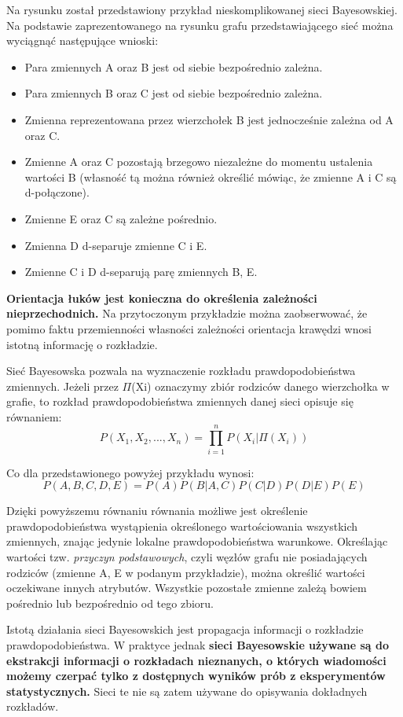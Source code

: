 Na rysunku został przedstawiony przykład nieskomplikowanej sieci Bayesowskiej. Na podstawie zaprezentowanego na rysunku grafu przedstawiającego sieć można wyciągnąć następujące wnioski:
\begin{itemize}
\item Para zmiennych A oraz B jest od siebie bezpośrednio zależna.
\item Para zmiennych B oraz C jest od siebie bezpośrednio zależna.
\item Zmienna reprezentowana przez wierzchołek B jest jednocześnie zależna od A oraz C.
\item Zmienne A oraz C pozostają brzegowo niezależne do momentu ustalenia wartości B (własność tą można również określić mówiąc, że zmienne A i C są d-połączone).
\item Zmienne E oraz C są zależne pośrednio.
\item Zmienna D d-separuje zmienne C i E.
\item Zmienne C i D d-separują parę zmiennych B, E.
\end{itemize}

\textbf{Orientacja łuków jest konieczna do określenia zależności nieprzechodnich.} Na przytoczonym przykładzie można zaobserwować, że pomimo faktu przemienności własności zależności orientacja krawędzi wnosi istotną informację o rozkładzie.\newline

\newpage

Sieć Bayesowska pozwala na wyznaczenie rozkładu prawdopodobieństwa zmiennych. Jeżeli przez \(\Pi\)(Xi) oznaczymy zbiór rodziców danego wierzchołka w grafie, to rozkład prawdopodobieństwa zmiennych danej sieci opisuje się równaniem:
$$ P(X_{1}, X_{2}, ... , X_{n}) = \prod _{i=1}^{n}P(X_{i} | \Pi (X_{i})) $$

Co dla przedstawionego powyżej przykładu wynosi:
$$ P(A,B,C,D,E) = P(A)P(B|A,C)P(C|D)P(D|E)P(E) $$ 

Dzięki powyższemu równaniu równania możliwe jest określenie prawdopodobieństwa wystąpienia określonego wartościowania wszystkich zmiennych, znając jedynie lokalne prawdopodobieństwa warunkowe. Określając wartości tzw. \textit{przyczyn podstawowych}, czyli węzłów grafu nie posiadających rodziców (zmienne A, E w podanym przykładzie), można określić wartości oczekiwane innych atrybutów. Wszystkie pozostałe zmienne zależą bowiem pośrednio lub bezpośrednio od tego zbioru.

Istotą działania sieci Bayesowskich jest propagacja informacji o rozkładzie prawdopodobieństwa. 
W praktyce jednak \textbf{sieci Bayesowskie używane są do ekstrakcji informacji o rozkładach nieznanych, o których wiadomości możemy czerpać tylko z dostępnych wyników prób z eksperymentów statystycznych.} Sieci te nie są zatem używane do opisywania dokładnych rozkładów.

